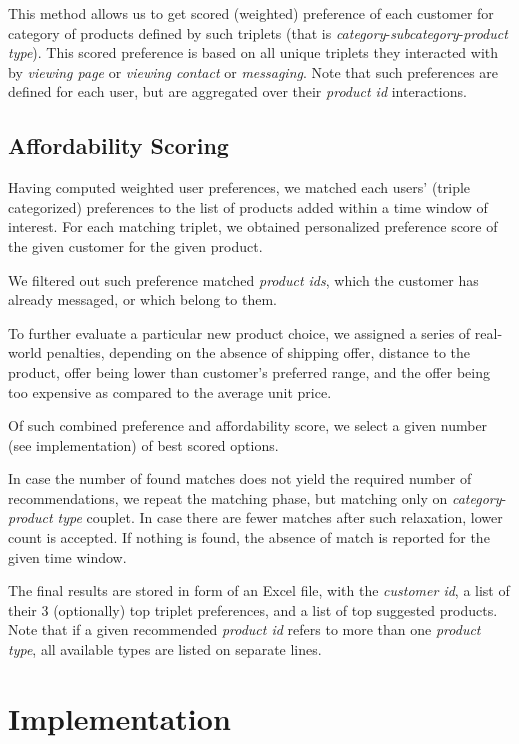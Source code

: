 \documentclass{report}
\begin{document}
This method allows us to get scored (weighted) preference of each customer for category of products defined by such triplets
(that is \emph{category}-\emph{subcategory}-\emph{product type}). This scored preference is based on all unique triplets they 
interacted with by \emph{viewing page} or \emph{viewing contact} or \emph{messaging}. 
Note that such preferences are defined for each user, but are aggregated over their \emph{product id} interactions.

\subsection*{Affordability Scoring}

Having computed weighted user preferences, we matched each users' (triple categorized) preferences to the list of
products added within a time window of interest. For each matching triplet, we obtained personalized preference 
score of the given customer for the given product.

We filtered out such preference matched \emph{product ids}, which the customer has already messaged, or which belong
to them.

To further evaluate a particular new product choice, we assigned a series of real-world penalties, depending on the
absence of shipping offer, distance to the product, offer being lower than customer's preferred range, and the 
offer being too expensive as compared to the average unit price.

Of such combined preference and affordability score, we select a given number (see implementation) of best scored
options.

In case the number of found matches does not yield the required number of recommendations, we repeat the matching 
phase, but matching only on \emph{category}-\emph{product type} couplet. In case there are fewer matches after such
relaxation, lower count is accepted. If nothing is found, the absence of match is reported for the given time window.

The final results are stored in form of an Excel file, with the \emph{customer id}, a list of their 3 (optionally)
top triplet preferences, and a list of top suggested products. Note that if a given recommended \emph{product id}
refers to more than one \emph{product type}, all available types are listed on separate lines.

\section*{Implementation}
\end{document}
